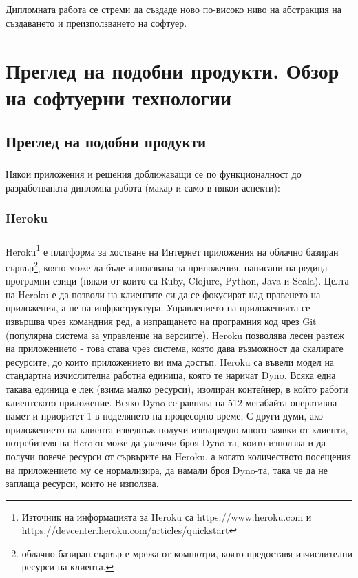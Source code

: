 \documentclass[pdftex,14pt,a4paper]{extreport}
\begin{document}
\paragraph {} Дипломната работа се стреми да създаде ново по-високо ниво на абстракция на създаването и преизползването на софтуер.
\chapter {Преглед на подобни продукти. Обзор на софтуерни технологии}
\section {Преглед на подобни продукти}
\paragraph {}
Някои приложения и решения доближаващи се по функционалност до разработваната дипломна работа (макар и само в някои аспекти):
\subsection {Heroku}
\paragraph {}
Heroku\footnote{Източник на информацията за Heroku са \url{https://www.heroku.com} и \\\url{https://devcenter.heroku.com/articles/quickstart}} е платформа за хостване на Интернет приложения на облачно базиран сървър\footnote{облачно базиран сървър е мрежа от компютри, която предоставя изчислителни ресурси на клиента.}, която може да бъде използвана за приложения, написани на редица програмни езици (някои от които са Ruby, Clojure, Python, Java и Scala). Целта на Heroku е да позволи на клиентите си да се фокусират над правенето на приложения, а не на инфраструктура. Управлението на приложенията се извършва чрез командния ред, а изпращането на програмния код чрез Git (популярна система за управление на версиите). Heroku позволява лесен разтеж на приложението - това става чрез система, която дава възможност да скалирате ресурсите, до които приложението ви има достъп. Heroku са въвели модел на стандартна изчислителна работна единица, която те наричат Dyno. Всяка една такава единица е лек (взима малко ресурси), изолиран контейнер, в който работи клиентското приложение. Всяко Dyno се равнява на 512 мегабайта оперативна памет и приоритет 1 в поделянето на процесорно време. С други думи, ако приложението на клиента изведнъж получи извънредно много заявки от клиенти, потребителя на Heroku може да увеличи броя Dyno-та, които използва и да получи повече ресурси от сървърите на Heroku, а когато количеството посещения на приложението му се нормализира, да намали броя Dyno-та, така че да не заплаща ресурси, които не използва.
\end{document}
